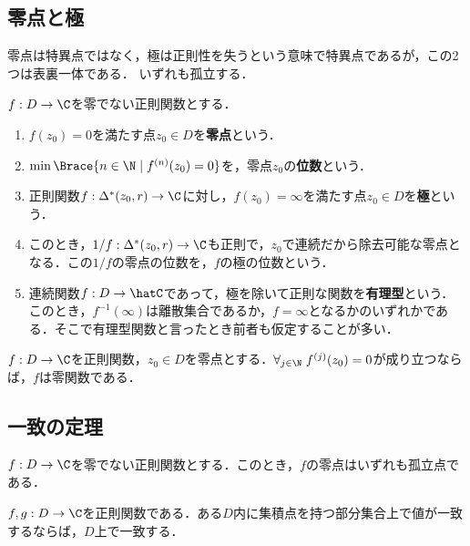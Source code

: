\documentclass[uplatex, dvipdfmx]{jsreport}
\begin{document}
\subsection{零点と極}

\begin{tcolorbox}[colframe=ForestGreen, colback=ForestGreen!10!white,breakable,colbacktitle=ForestGreen!40!white,coltitle=black,fonttitle=\bfseries\sffamily,
title=]
    零点は特異点ではなく，極は正則性を失うという意味で特異点であるが，この2つは表裏一体である．
    いずれも孤立する．
\end{tcolorbox}

\begin{definition}
    $f:D\to\C$を零でない正則関数とする．
    \begin{enumerate}
        \item $f(z_0)=0$を満たす点$z_0\in D$を\textbf{零点}という．
        \item $\min\Brace{n\in\N\mid f^{(n)}(z_0)=0}$を，零点$z_0$の\textbf{位数}という．
        \item 正則関数$f:\Delta^*(z_0,r)\to\C$に対し，$f(z_0)=\infty$を満たす点$z_0\in D$を\textbf{極}という．
        \item このとき，$1/f:\Delta^*(z_0,r)\to\C$も正則で，$z_0$で連続だから除去可能な零点となる．この$1/f$の零点の位数を，$f$の極の位数という．
        \item 連続関数$f:D\to\hatC$であって，極を除いて正則な関数を\textbf{有理型}という．このとき，$f^{-1}(\infty)$は離散集合であるか，$f=\infty$となるかのいずれかである．そこで有理型関数と言ったとき前者も仮定することが多い．
    \end{enumerate}
\end{definition}

\begin{proposition}[位数は有限である]
    $f:D\to\C$を正則関数，$z_0\in D$を零点とする．$\forall_{j\in\N}\;f^{(j)}(z_0)=0$が成り立つならば，$f$は零関数である．
\end{proposition}

\subsection{一致の定理}

\begin{theorem}
    $f:D\to\C$を零でない正則関数とする．このとき，$f$の零点はいずれも孤立点である．
\end{theorem}

\begin{corollary}[一致の定理]
    $f,g:D\to\C$を正則関数である．ある$D$内に集積点を持つ部分集合上で値が一致するならば，$D$上で一致する．
\end{corollary}
\end{document}
